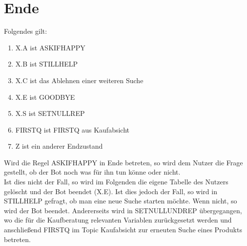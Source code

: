 \section{Ende}
\label{sec:Ende}

Folgendes gilt:

\begin{enumerate}
\item{X.A ist ASKIFHAPPY}
\item{X.B ist STILLHELP}
\item{X.C ist das Ablehnen einer weiteren Suche}
\item{X.E ist GOODBYE}
\item{X.S ist SETNULLREP}
\item{FIRSTQ ist FIRSTQ aus Kaufabsicht}
\item{Z ist ein anderer Endzustand}
\end{enumerate}

Wird die Regel ASKIFHAPPY in Ende betreten, so wird dem Nutzer die Frage gestellt, ob der Bot noch was für ihn tun könne oder nicht.\\
Ist dies nicht der Fall, so wird im Folgenden die eigene Tabelle des Nutzers gelöscht und der Bot beendet (X.E). Ist dies jedoch der Fall, so wird in STILLHELP gefragt, ob man eine neue Suche starten möchte. Wenn nicht, so wird der Bot beendet. Andererseits wird in SETNULLUNDREP übergegangen, wo die für die Kaufberatung relevanten Variablen zurückgesetzt werden und anschließend FIRSTQ im Topic Kaufabsicht zur erneuten Suche eines Produkts betreten. 

